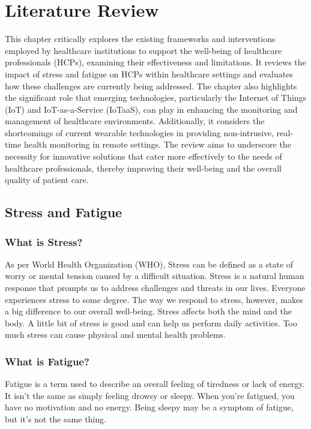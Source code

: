 \newpage
\chapter{Literature Review}

This chapter critically explores the existing frameworks and interventions employed by healthcare institutions to support the well-being of healthcare professionals (HCPs), examining their effectiveness and limitations. It reviews the impact of stress and fatigue on HCPs within healthcare settings and evaluates how these challenges are currently being addressed. The chapter also highlights the significant role that emerging technologies, particularly the Internet of Things (IoT) and IoT-as-a-Service (IoTaaS), can play in enhancing the monitoring and management of healthcare environments. Additionally, it considers the shortcomings of current wearable technologies in providing non-intrusive, real-time health monitoring in remote settings. The review aims to underscore the necessity for innovative solutions that cater more effectively to the needs of healthcare professionals, thereby improving their well-being and the overall quality of patient care.

\section{Stress and Fatigue}
\subsection{What is Stress?}
As per World Health Organization (WHO), Stress can be defined as a state of worry or mental tension caused by a difficult situation. Stress is a natural human response that prompts us to address challenges and threats in our lives. Everyone experiences stress to some degree. The way we respond to stress, however, makes a big difference to our overall well-being. Stress affects both the mind and the body. A little bit of stress is good and can help us perform daily activities. Too much stress can cause physical and mental health problems. \cite{48} 

\subsection{What is Fatigue?}
Fatigue is a term used to describe an overall feeling of tiredness or lack of energy. It isn’t the same as simply feeling drowsy or sleepy. When you’re fatigued, you have no motivation and no energy. Being sleepy may be a symptom of fatigue, but it’s not the same thing. \cite{49}

